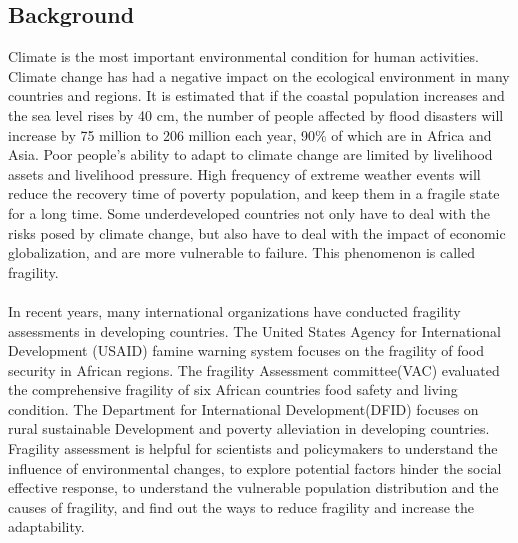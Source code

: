 \documentclass{mcmthesis}
\begin{document}
\subsection{Background}
Climate is the most important environmental condition for human activities.
Climate change has had a negative impact on the ecological environment in 
many countries and regions. It is estimated that if the coastal population 
increases and the sea level rises by 40 cm, the number of people affected by 
flood disasters will increase by 75 million to 206 million each year, 90\% of
which are in Africa and Asia. Poor people's ability to adapt to climate change 
are limited by livelihood assets and livelihood pressure. High frequency of
extreme weather events will reduce the recovery time of poverty population, 
and keep them in a fragile state for a long time. Some underdeveloped 
countries not only have to deal with the risks posed by climate change, 
but also have to deal with the impact of economic globalization, 
and are more vulnerable to failure. This phenomenon is called fragility.\\\\
In recent years, many international organizations have conducted fragility 
assessments in developing countries. The United States Agency for International
Development (USAID) famine warning system focuses on the fragility of 
food security in African regions. The fragility Assessment committee(VAC) 
evaluated the comprehensive fragility of six African countries food safety 
and living condition. The Department for International Development(DFID)
focuses on rural sustainable Development and poverty alleviation in developing
countries. Fragility assessment is helpful for scientists and 
policymakers to understand the influence of environmental changes, 
to explore potential factors hinder the social effective response, 
to understand the vulnerable population distribution and the causes 
of fragility, and find out the ways to reduce fragility and 
increase the adaptability.
\end{document}
